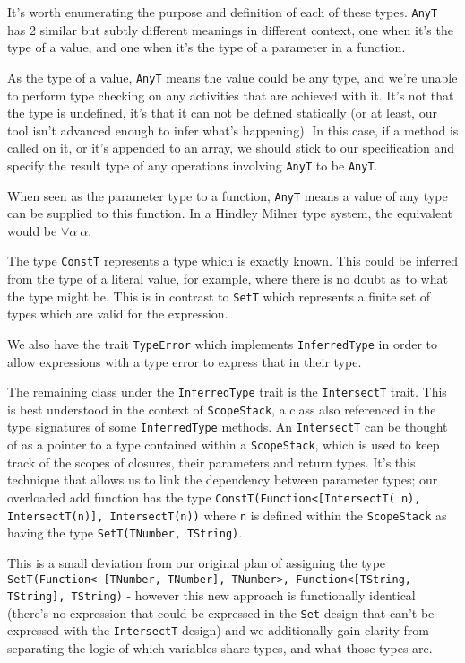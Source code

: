 \documentclass[british, twoside, openright]{bhamthesis}
\theoremstyle{definition}
\begin{document}
      It's worth enumerating the purpose and definition of each of these types. \texttt{AnyT} has 2 similar but subtly different meanings in different context, one when it's the type of a value, and one when it's the type of a parameter in a function.

      As the type of a value, \texttt{AnyT} means the value could be any type, and we're unable to perform type checking on any activities that are achieved with it. It's not that the type is undefined, it's that it can not be defined statically (or at least, our tool isn't advanced enough to infer what's happening). In this case, if a method is called on it, or it's appended to an array, we should stick to our specification and specify the result type of any operations involving \texttt{AnyT} to be \texttt{AnyT}.

      When seen as the parameter type to a function, \texttt{AnyT} means a value of any type can be supplied to this function. In a Hindley Milner type system, the equivalent would be $\forall\alpha~\alpha$.

      The type \texttt{ConstT} represents a type which is exactly known. This could be inferred from the type of a literal value, for example, where there is no doubt as to what the type might be. This is in contrast to \texttt{SetT} which represents a finite set of types which are valid for the expression.

      We also have the trait \texttt{TypeError} which implements \texttt{InferredType} in order to allow expressions with a type error to express that in their type.

      The remaining class under the \texttt{InferredType} trait is the \texttt{IntersectT} trait. This is best understood in the context of \texttt{ScopeStack}, a class also referenced in the type signatures of some \texttt{InferredType} methods. An \texttt{IntersectT} can be thought of as a pointer to a type contained within a \texttt{ScopeStack}, which is used to keep track of the scopes of closures, their parameters and return types. It's this technique that allows us to link the dependency between parameter types; our overloaded add function has the type \texttt{ConstT(Function<[IntersectT( n), IntersectT(n)], IntersectT(n))} where \texttt{n} is defined within the \texttt{ScopeStack} as having the type \texttt{SetT(TNumber, TString)}.

      This is a small deviation from our original plan of assigning the type \texttt{SetT(Function< [TNumber, TNumber], TNumber>, Function<[TString, TString], TString)} - however this new approach is functionally identical (there's no expression that could be expressed in the \texttt{Set} design that can't be expressed with the \texttt{IntersectT} design) and we additionally gain clarity from separating the logic of which variables share types, and what those types are.
\end{document}
